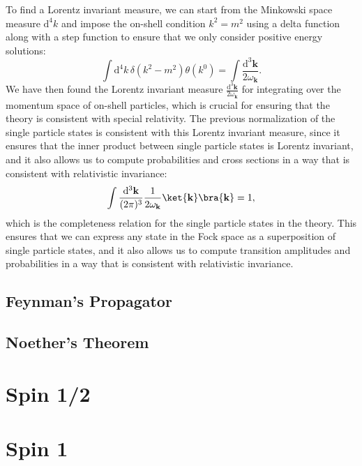 \begin{remark}
    To find a Lorentz invariant measure, we can start from the Minkowski space measure \(\mathrm{d}^4 k\) and impose the on-shell condition \(k^2 = m^2\) using a delta function along with a step function to ensure that we only consider positive energy solutions:
    \[
        \int \mathrm{d}^4 k \, \delta(k^2 - m^2) \theta(k^0) = \int \frac{\mathrm{d}^3 \mathbf{k}}{2 \omega_{\mathbf{k}}}.
    \]
    We have then found the Lorentz invariant measure \(\frac{\mathrm{d}^3 \mathbf{k}}{2 \omega_{\mathbf{k}}}\) for integrating over the momentum space of on-shell particles, which is crucial for ensuring that the theory is consistent with special relativity. The previous normalization of the single particle states is consistent with this Lorentz invariant measure, since it ensures that the inner product between single particle states is Lorentz invariant, and it also allows us to compute probabilities and cross sections in a way that is consistent with relativistic invariance:
    \[
        \int \frac{\mathrm{d}^3 \mathbf{k}}{(2\pi)^3} \frac{1}{2 \omega_{\mathbf{k}}} \ket{\mathbf{k}} \bra{\mathbf{k}} = 1,
    \]
    which is the completeness relation for the single particle states in the theory. This ensures that we can express any state in the Fock space as a superposition of single particle states, and it also allows us to compute transition amplitudes and probabilities in a way that is consistent with relativistic invariance.
\end{remark}

\subsection{Feynman's Propagator}

\subsection{Noether's Theorem}

\section{Spin 1/2}

\section{Spin 1}

